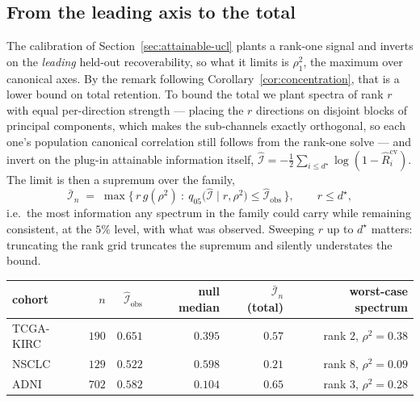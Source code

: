 \documentclass{article}
\begin{document}
\subsection{From the leading axis to the total}
\label{sec:attainable-total}

The calibration of Section~\ref{sec:attainable-ucl} plants a rank-one signal and
inverts on the \emph{leading} held-out recoverability, so what it limits is
$\rho_1^2$, the maximum over canonical axes. By the remark following
Corollary~\ref{cor:concentration}, that is a lower bound on total retention. To
bound the total we plant spectra of rank $r$ with equal per-direction strength
--- placing the $r$ directions on disjoint blocks of principal components, which
makes the sub-channels exactly orthogonal, so each one's population canonical
correlation still follows from the rank-one solve --- and invert on the plug-in
attainable information itself,
$\hat{\mathcal{I}} = -\tfrac12\sum_{i\le d^\star}\log(1-\hat R_i^{\mathrm{cv}})$.
The limit is then a supremum over the family,
\begin{equation}
\bar{\mathcal{I}}_n \;=\; \max\Big\{\, r\,g(\rho^2)\ :\
q_{05}\big(\hat{\mathcal{I}} \mid r,\rho^2\big) \le \hat{\mathcal{I}}_{\mathrm{obs}} \,\Big\},
\qquad r \le d^\star,
\label{eq:total-ucl}
\end{equation}
i.e.\ the most information any spectrum in the family could carry while
remaining consistent, at the $5\%$ level, with what was observed. Sweeping
$r$ up to $d^\star$ matters: truncating the rank grid truncates the supremum and
silently understates the bound.

\begin{center}
\begin{tabular}{lrrrrr}
\toprule
cohort & $n$ & $\hat{\mathcal{I}}_{\mathrm{obs}}$ & null median & $\bar{\mathcal{I}}_n$ (total) & worst-case spectrum\\
\midrule
TCGA-KIRC & $190$ & $0.651$ & $0.395$ & $0.57$ & rank $2$, $\rho^2=0.38$\\
NSCLC     & $129$ & $0.522$ & $0.598$ & $0.21$ & rank $8$, $\rho^2=0.09$\\
ADNI      & $702$ & $0.582$ & $0.104$ & $0.65$ & rank $3$, $\rho^2=0.28$\\
\bottomrule
\end{tabular}
\end{center}
\end{document}
